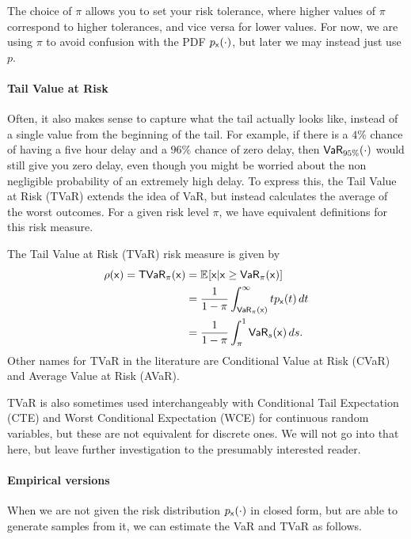 The choice of $\pi$ allows you to set your risk tolerance, where higher values of $\pi$ correspond to higher tolerances, and vice versa for lower values. For now, we are using $\pi$ to avoid confusion with the PDF $\pxdd$, but later we may instead just use $p$.

\paragraph{Tail Value at Risk} Often, it also makes sense to capture what the tail actually looks like, instead of a single value from the beginning of the tail. For example, if there is a $4\%$ chance of having a five hour delay and a $96\%$ chance of zero delay, then $\VaRd{95\%}$ would still give you zero delay, even though you might be worried about the non negligible probability of an extremely high delay. To express this, the Tail Value at Risk (TVaR) extends the idea of VaR, but instead calculates the average of the worst outcomes. For a given risk level $\pi$, we have equivalent definitions for this risk measure.

\begin{definition}
    The Tail Value at Risk (TVaR) risk measure is given by 
    \begin{align}
        \rs{\rx} = \TVaR{\pi}{\rx} &= \EX{}{\rx \given \rx \ge \VaR{\pi}{\rx} }\\
        &= \frac1{1-\pi}\int_{\VaR{\pi}{\rx}}^\infty t\pxd{t}\,dt\\
        &= \frac1{1-\pi}\int_{\pi}^1 \VaR{s}{\rx}\,ds.
    \end{align}
    Other names for TVaR in the literature are Conditional Value at Risk (CVaR) and Average Value at Risk (AVaR).
\end{definition}
TVaR is also sometimes used interchangeably with Conditional Tail Expectation (CTE) and Worst Conditional Expectation (WCE) for continuous random variables, but these are not equivalent for discrete ones. We will not go into that here, but leave further investigation to the presumably interested reader.

\paragraph{Empirical versions} When we are not given the risk distribution $\pxdd$ in closed form, but are able to generate samples from it, we can estimate the VaR and TVaR as follows.

